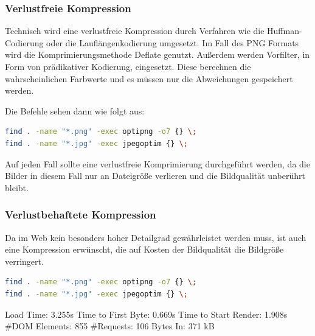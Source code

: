 \subsubsection{Verlustfreie Kompression} Technisch wird eine verlustfreie Kompression durch Verfahren wie die Huffman-Codierung oder die Lauflängenkodierung umgesetzt. Im Fall des PNG Formats wird die Komprimierungsmethode Deflate genutzt. Außerdem werden Vorfilter, in Form von prädikativer Kodierung, eingesetzt. Diese berechnen die wahrscheinlichen Farbwerte und es müssen nur die Abweichungen gespeichert werden. 

Die Befehle sehen dann wie folgt aus:

\begin{lstlisting}[language=bash,label=Optimieren mit find,caption=Optimieren mit find]
find . -name "*.png" -exec optipng -o7 {} \;
find . -name "*.jpg" -exec jpegoptim {} \;
\end{lstlisting}
Auf jeden Fall sollte eine verlustfreie Komprimierung durchgeführt werden, da die Bilder in diesem Fall nur an Dateigröße verlieren und die Bildqualität unberührt bleibt. 
\subsubsection{Verlustbehaftete Kompression} Da im Web kein besonders hoher Detailgrad gewährleistet werden muss, ist auch eine Kompression erwünscht, die auf Kosten der Bildqualität die Bildgröße verringert. 
\begin{lstlisting}[language=bash,label=Optimieren mit find,caption=Optimieren mit find]
find . -name "*.png" -exec optipng -o7 {} \;
find . -name "*.jpg" -exec jpegoptim {} \;
\end{lstlisting}
Load Time: 3.255s
Time to First Byte: 0.669s %
Time to Start Render: 1.908s
\#DOM Elements: 855 	
\#Requests: 106 %
Bytes In: 371 kB %

